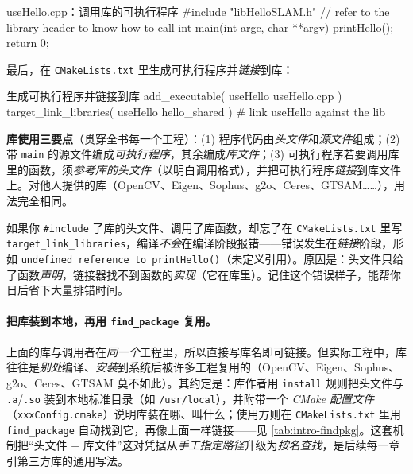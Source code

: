 \begin{codebox}[C++]{useHello.cpp：调用库的可执行程序}
#include "libHelloSLAM.h"   // refer to the library header to know how to call
int main(int argc, char **argv) {
    printHello();
    return 0;
}
\end{codebox}

\noindent 最后，在 \texttt{CMakeLists.txt} 里生成可执行程序并\emph{链接}到库：

\begin{codebox}[text]{生成可执行程序并链接到库}
add_executable( useHello useHello.cpp )
target_link_libraries( useHello hello_shared )   # link useHello against the lib
\end{codebox}

\begin{insight}
\textbf{库使用三要点}（贯穿全书每一个工程）：(1) 程序代码由\emph{头文件}和\emph{源文件}组成；(2) 带 \texttt{main} 的源文件编成\emph{可执行程序}，其余编成\emph{库文件}；(3) 可执行程序若要调用库里的函数，须\emph{参考库的头文件}（以明白调用格式），并把可执行程序\emph{链接}到库文件上\cite{gaoxiang2019slam14}。对他人提供的库（OpenCV、Eigen、Sophus、g2o、Ceres、GTSAM……），用法完全相同。
\end{insight}

\begin{pitfall}[陷阱：忘了链接库会怎样]
如果你 \texttt{\#include} 了库的头文件、调用了库函数，却忘了在 \texttt{CMakeLists.txt} 里写 \texttt{target\_link\_libraries}，编译\emph{不会}在编译阶段报错——错误发生在\emph{链接}阶段，形如 \texttt{undefined reference to printHello()}（未定义引用）。原因是：头文件只给了函数\emph{声明}，链接器找不到函数的\emph{实现}（它在库里）。记住这个错误样子，能帮你日后省下大量排错时间。
\end{pitfall}

\paragraph{把库装到本地，再用 \texttt{find\_package} 复用。}
上面的库与调用者在\emph{同一个}工程里，所以直接写库名即可链接。但实际工程中，库往往是\emph{别处}编译、\emph{安装}到系统后被许多工程复用的（OpenCV、Eigen、Sophus、g2o、Ceres、GTSAM 莫不如此）。其约定是：库作者用 \texttt{install} 规则把头文件与 \texttt{.a}/\texttt{.so} 装到本地标准目录（如 \texttt{/usr/local}），并附带一个 \emph{CMake 配置文件}（\texttt{xxxConfig.cmake}）说明库装在哪、叫什么；使用方则在 \texttt{CMakeLists.txt} 里用 \texttt{find\_package} 自动找到它，再像上面一样链接——见 \cref{tab:intro-findpkg}。这套机制把“头文件 + 库文件”这对凭据从\emph{手工指定路径}升级为\emph{按名查找}，是后续每一章引第三方库的通用写法。

